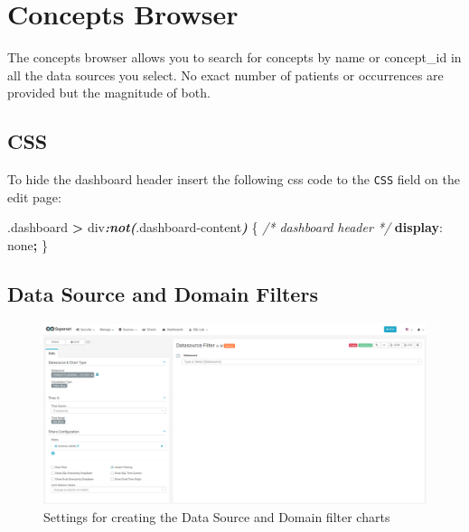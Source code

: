 \documentclass[
]{book}
\newenvironment{Shaded}{\begin{snugshade}}{\end{snugshade}}
\newcommand{\CommentTok}[1]{\textcolor[rgb]{0.56,0.35,0.01}{\textit{#1}}}
\newcommand{\DecValTok}[1]{\textcolor[rgb]{0.00,0.00,0.81}{#1}}
\newcommand{\FunctionTok}[1]{\textcolor[rgb]{0.00,0.00,0.00}{#1}}
\newcommand{\InformationTok}[1]{\textcolor[rgb]{0.56,0.35,0.01}{\textbf{\textit{#1}}}}
\newcommand{\KeywordTok}[1]{\textcolor[rgb]{0.13,0.29,0.53}{\textbf{#1}}}
\newcommand{\NormalTok}[1]{#1}
\newcommand{\OperatorTok}[1]{\textcolor[rgb]{0.81,0.36,0.00}{\textbf{#1}}}
\begin{document}
\hypertarget{concepts-browser}{%
\chapter{Concepts Browser}\label{concepts-browser}}

The concepts browser allows you to search for concepts by name or concept\_id in all the data sources you select. No exact number of patients or occurrences are provided but the magnitude of both.

\hypertarget{css-5}{%
\section{CSS}\label{css-5}}

To hide the dashboard header insert the following css code to the \texttt{CSS} field on the edit page:

\begin{Shaded}
\begin{Highlighting}[]
\FunctionTok{.dashboard} \OperatorTok{\textgreater{}}\NormalTok{ div}\InformationTok{:not(}\FunctionTok{.dashboard{-}content}\InformationTok{)}\NormalTok{ \{  }\CommentTok{/* dashboard header */}
  \KeywordTok{display}\NormalTok{: }\DecValTok{none}\OperatorTok{;}
\NormalTok{\}}
\end{Highlighting}
\end{Shaded}

\hypertarget{data-source-and-domain-filters}{%
\section{Data Source and Domain Filters}\label{data-source-and-domain-filters}}

\begin{figure}
\includegraphics[width=1\linewidth]{images/08-concepts_browser/01-filters} \caption{Settings for creating the Data Source and Domain filter charts}\label{fig:filters}
\end{figure}
\end{document}
